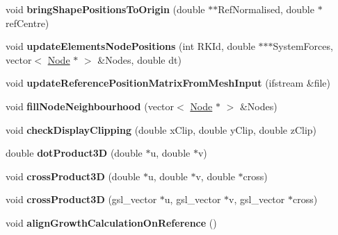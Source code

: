 \begin{DoxyCompactItemize}
\item 
\hypertarget{classShapeBase_aa07ce2dcc297aa5aea5a37516dcea069}{}void {\bfseries bring\+Shape\+Positions\+To\+Origin} (double $\ast$$\ast$Ref\+Normalised, double $\ast$ref\+Centre)\label{classShapeBase_aa07ce2dcc297aa5aea5a37516dcea069}

\item 
\hypertarget{classShapeBase_af4df88dad7ec1c487736216e15b5c67a}{}void {\bfseries update\+Elements\+Node\+Positions} (int R\+K\+Id, double $\ast$$\ast$$\ast$System\+Forces, vector$<$ \hyperlink{classNode}{Node} $\ast$ $>$ \&Nodes, double dt)\label{classShapeBase_af4df88dad7ec1c487736216e15b5c67a}

\item 
\hypertarget{classShapeBase_a29d28195e334308f1b3afba113ef1212}{}void {\bfseries update\+Reference\+Position\+Matrix\+From\+Mesh\+Input} (ifstream \&file)\label{classShapeBase_a29d28195e334308f1b3afba113ef1212}

\item 
\hypertarget{classShapeBase_afe299910c51313a27526c585df128047}{}void {\bfseries fill\+Node\+Neighbourhood} (vector$<$ \hyperlink{classNode}{Node} $\ast$ $>$ \&Nodes)\label{classShapeBase_afe299910c51313a27526c585df128047}

\item 
\hypertarget{classShapeBase_a3a3490f8a96e14e59b82f4de24ce48e2}{}void {\bfseries check\+Display\+Clipping} (double x\+Clip, double y\+Clip, double z\+Clip)\label{classShapeBase_a3a3490f8a96e14e59b82f4de24ce48e2}

\item 
\hypertarget{classShapeBase_a6b58642f88a23bd984d7af48cbd4f95a}{}double {\bfseries dot\+Product3\+D} (double $\ast$u, double $\ast$v)\label{classShapeBase_a6b58642f88a23bd984d7af48cbd4f95a}

\item 
\hypertarget{classShapeBase_ab5c4c774227af1d446f80c0ef58044c9}{}void {\bfseries cross\+Product3\+D} (double $\ast$u, double $\ast$v, double $\ast$cross)\label{classShapeBase_ab5c4c774227af1d446f80c0ef58044c9}

\item 
\hypertarget{classShapeBase_a334a6cec6a698ac49006d8216a93ced9}{}void {\bfseries cross\+Product3\+D} (gsl\+\_\+vector $\ast$u, gsl\+\_\+vector $\ast$v, gsl\+\_\+vector $\ast$cross)\label{classShapeBase_a334a6cec6a698ac49006d8216a93ced9}

\item 
\hypertarget{classShapeBase_a9a980e69b3ccad29e21499921d575829}{}void {\bfseries align\+Growth\+Calculation\+On\+Reference} ()\label{classShapeBase_a9a980e69b3ccad29e21499921d575829}


\end{DoxyCompactItemize}
